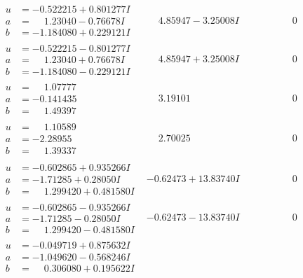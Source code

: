 \documentclass[1p]{elsarticle_modified}
\theoremstyle{definition}
\begin{document}
$$\begin{array}{c|c|c}
\begin{aligned}
u &= -0.522215 + 0.801277 I \\
a &= \phantom{-}1.23040 - 0.76678 I \\
b &= -1.184080 + 0.229121 I\end{aligned}
 & \phantom{-}4.85947 - 3.25008 I & \phantom{-0.000000 } 0 \\ \hline\begin{aligned}
u &= -0.522215 - 0.801277 I \\
a &= \phantom{-}1.23040 + 0.76678 I \\
b &= -1.184080 - 0.229121 I\end{aligned}
 & \phantom{-}4.85947 + 3.25008 I & \phantom{-0.000000 } 0 \\ \hline\begin{aligned}
u &= \phantom{-}1.07777\phantom{ +0.000000I} \\
a &= -0.141435\phantom{ +0.000000I} \\
b &= \phantom{-}1.49397\phantom{ +0.000000I}\end{aligned}
 & \phantom{-}3.19101\phantom{ +0.000000I} & \phantom{-0.000000 } 0 \\ \hline\begin{aligned}
u &= \phantom{-}1.10589\phantom{ +0.000000I} \\
a &= -2.28955\phantom{ +0.000000I} \\
b &= \phantom{-}1.39337\phantom{ +0.000000I}\end{aligned}
 & \phantom{-}2.70025\phantom{ +0.000000I} & \phantom{-0.000000 } 0 \\ \hline\begin{aligned}
u &= -0.602865 + 0.935266 I \\
a &= -1.71285 + 0.28050 I \\
b &= \phantom{-}1.299420 + 0.481580 I\end{aligned}
 & -0.62473 + 13.83740 I & \phantom{-0.000000 } 0 \\ \hline\begin{aligned}
u &= -0.602865 - 0.935266 I \\
a &= -1.71285 - 0.28050 I \\
b &= \phantom{-}1.299420 - 0.481580 I\end{aligned}
 & -0.62473 - 13.83740 I & \phantom{-0.000000 } 0 \\ \hline\begin{aligned}
u &= -0.049719 + 0.875632 I \\
a &= -1.049620 - 0.568246 I \\
b &= \phantom{-}0.306080 + 0.195622 I\end{aligned}

\end{array}$$
\end{document}
